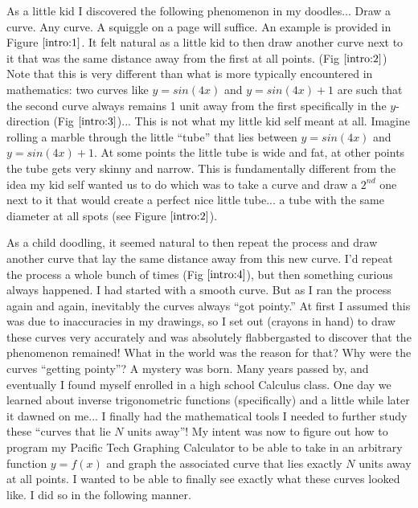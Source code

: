 As a little kid I discovered the following phenomenon in my doodles... Draw a curve. Any curve. A squiggle on a page will suffice. An example is provided in Figure $\ref{intro:1}$. It felt natural as a little kid to then draw another curve next to it that was the same distance away from the first at all points. (Fig $\ref{intro:2}$) Note that this is very different than what is more typically encountered in mathematics: two curves like $y = sin(4x)$ and $y = sin(4x) + 1$ are such that the second curve always remains 1 unit away from the first specifically in the $y$-direction (Fig $\ref{intro:3}$)... This is not what my little kid self meant at all. Imagine rolling a marble through the little ``tube'' that lies between $y = sin(4x)$ and $y = sin(4x) + 1$. At some points the little tube is wide and fat, at other points the tube gets very skinny and narrow. This is fundamentally different from the idea my kid self wanted us to do which was to take a curve and draw a $2^{nd}$ one next to it that would create a perfect nice little tube... a tube with the same diameter at all spots (see Figure $\ref{intro:2}$).

As a child doodling, it seemed natural to then repeat the process and draw another curve that lay the same distance away from this new curve. I’d repeat the process a whole bunch of times (Fig $\ref{intro:4}$), but then something curious always happened. I had started with a smooth curve. But as I ran the process again and again, inevitably the curves always ``got pointy.'' At first I assumed this was due to inaccuracies in my drawings, so I set out (crayons in hand) to draw these curves very accurately and was absolutely flabbergasted to discover that the phenomenon remained! What in the world was the reason for that? Why were the curves ``getting pointy''? A mystery was born. Many years passed by, and eventually I found myself enrolled in a high school Calculus class. One day we learned about inverse trigonometric functions (specifically) and a little while later it dawned on me... I finally had the mathematical tools I needed to further study these ``curves that lie $N$ units away''! My intent was now to figure out how to program my Pacific Tech Graphing Calculator to be able to take in an arbitrary function $y = f(x)$ and graph the associated curve that lies exactly $N$ units away at all points. I wanted to be able to finally see exactly what these curves looked like. I did so in the following manner.
